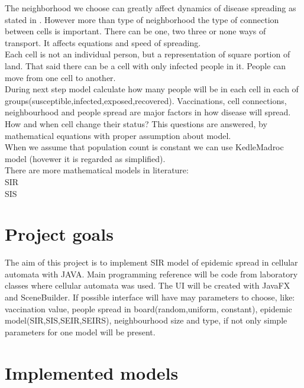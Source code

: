 \documentclass[a4paper, 11pt]{article}
\begin{document}
	The neighborhood we choose can greatly affect dynamics of disease spreading as stated in \cite{cisse}. However more than type of neighborhood the type of connection between cells is important. There can be one, two three or none ways of transport. It affects equations and speed of spreading.\cite{WHITE} \\
	
	Each cell is not an individual person, but a representation of square portion of land. That said there can be a cell with only infected people in it. People can move from one cell to another.\cite{WHITE}  \\
	
	During next step model calculate how many people will be in each cell in each of groups(susceptible,infected,exposed,recovered). Vaccinations, cell connections, neighbourhood and people spread are major factors in how disease will spread.\\
	
	
	

	How and when cell change their status? This questions are answered, by mathematical equations with proper assumption about model.\\
	When we assume that population count is constant we can use KedleMadroc model\cite{} (hovewer it is regarded as simplified).\\
	
	There are more mathematical models in literature:\\
	SIR\cite{}\\
	SIS\cite{}\\
	


	
\section{Project goals}

The aim of this project is to implement SIR model of epidemic spread in cellular automata with JAVA. Main programming reference will be code from laboratory classes where cellular automata was used. The UI will be created with JavaFX and SceneBuilder. If possible interface  will have may parameters to choose, like: vaccination value,  people spread in board(random,uniform, constant), epidemic model(SIR,SIS,SEIR,SEIRS), neighbourhood size and type, if not only simple parameters for one model will be present. 

\section{Implemented models}
\end{document}
